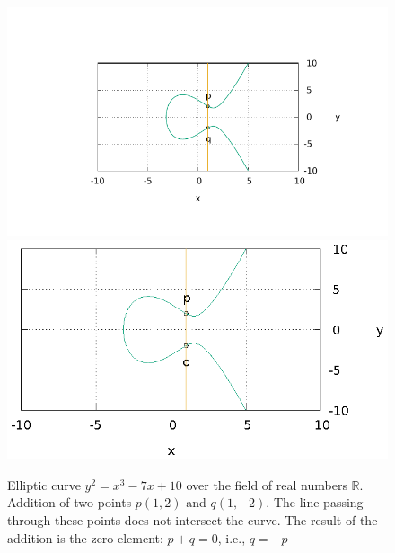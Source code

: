 \begin{figure}
\centering
\ifpdf
\includegraphics[angle=0,scale=1.5]
{./add/discretmath/picellipticsumeq.pdf}
\else
\includegraphics[angle=0,scale=1.5]
{./add/discretmath/picellipticsumeq.eps}
\fi
\caption{Elliptic curve $y^2 = x^3 -7 x + 10$ over the field
  of real numbers $\mathbb{R}$. Addition of two points $p(1,2)$ and
  $q(1,-2)$. The line passing through these points does not intersect the curve.
  The result of the addition is the zero element: $p + q = 0$, i.e., $q = -p$}
\label{fig:add:ellipticRsumEq}
\end{figure}